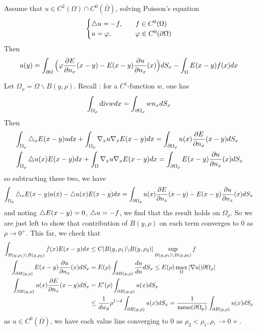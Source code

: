 \documentclass[12pt,a4paper]{article}
\newenvironment{proof}
{\begin{changemargin}{0.5cm}{0.5cm} 
	}%
	{\end{changemargin}
}
\begin{document}
 Assume that $u\in C^2(\Omega)\cap C^0(\bar{\Omega})$, solving Poisson's equation
\begin{align*}
\begin{cases}
\triangle u = - f, \quad &f \in C^0(\Omega)\\
u = \varphi, \quad &\varphi \in C^0(\partial \Omega)
\end{cases}
\end{align*}
Then
\begin{align*}
u(y) = \int_{\partial \Omega} \Big( \varphi\frac{\partial E}{\partial n_x}(x-y) - E(x-y)\frac{\partial u}{\partial n_x}(x) \Big) dS_x - \int_{\Omega} E(x-y) f(x) dx
\end{align*}
\begin{proof}
\pf Let $\Omega_{\rho} = \Omega \backslash B(y, \rho)$. Recall : for a $C^1$-function $w$, one has
\begin{align*}
\int_{\Omega_{\rho}}\text{div} w dx = \int_{\partial \Omega_{\rho}} wn_x dS_x
\end{align*}
Then
\begin{align*}
&\int_{\Omega_{\rho}} \triangle_x E(x-y) udx + \int_{\Omega_{\rho}} \nabla_x u\nabla_x E(x-y) dx = \int_{\partial \Omega_{\rho}} u(x)\frac{\partial E}{\partial n_x} (x-y) dS_x\\
& \int_{\Omega_{\rho}} \triangle u(x) E(x-y) dx + \int_{\Omega} \nabla_x u \nabla_x E(x-y) dx = \int_{\partial \Omega_{\rho}}E(x-y) \frac{\partial u}{\partial n_x}(x) dS_x
\end{align*}
so subtracting these two, we have
\begin{align*}
\int_{\Omega_{\rho}} \triangle_x E(x-y) u(x) - \triangle u(x)E(x-y) dx = \int_{\partial \Omega_{\rho}} u(x)\frac{\partial E}{\partial n_x} (x-y) - E(x-y)\frac{\partial u}{\partial n_x}(x) dS_x
\end{align*}
and noting $\triangle E(x-y) =0$, $\triangle u = -f$, we find that the result holds on $\Omega_{\rho}$. So we are just left to show that contribution of $B(y, \rho)$ on each term converges to 0 as $\rho \rightarrow 0^+$. This far, we check that
\begin{align*}
\int_{B(y, \rho_1)\backslash B(y, \rho_2)} f(x)E(x-y) dx &\leq C |B(y, \rho_1)\backslash B(y, \rho_2)| \sup_{B(y, \rho_1)\backslash B(y, \rho_2)} f \\
\int_{\partial B(y,\rho)} E(x-y) \frac{\partial u}{\partial n_x}(x)dS_x &= E(\rho) \int_{\partial B(y, \rho)} \frac{du}{dn} dS_x \leq   E(\rho) \max_{\Omega} |\nabla u| |\partial \Omega_{\rho}| \\
\int_{\partial B(y, \rho)} u(x) \frac{\partial E}{\partial n_x}(x-y) dS_x &= E'(\rho)\int_{\partial B(y, \rho)} u(x)dS_x\\
& \leq \frac{1}{dw_d} \rho^{1-d} \int_{\partial B(y, \rho)} u(x)dS_x = \frac{1}{\text{meas}(\partial \Omega_p)} \int_{\partial B(y, \rho)} u(x)dS_x
\end{align*}
as $u\in C^0(\bar{\Omega})$, we have each value line converging to 0 as $\rho_2 <\rho_1, \rho, \rightarrow 0+$.

\eop 
\end{proof}
\s
\end{document}
